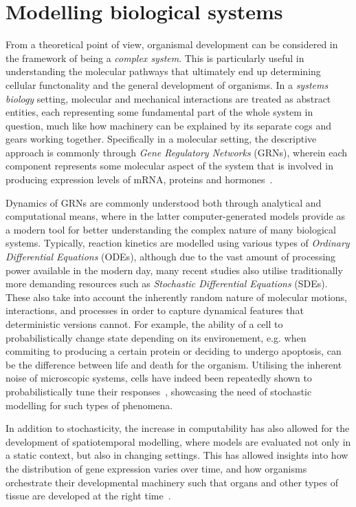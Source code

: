 \section{Modelling biological systems} %
\label{sec:modelling}
From a theoretical point of view, organismal development can be
considered in the framework of being a \textit{complex system}. This is
particularly useful in understanding the molecular pathways that ultimately end
up determining cellular functonality and the general development of organisms.
In a \textit{systems biology} setting, molecular and mechanical interactions are
treated as abstract entities, each representing some fundamental part of the
whole system in question, much like how machinery can be explained by its
separate cogs and gears working together. Specifically in a molecular setting,
the descriptive approach is commonly through \textit{Gene Regulatory Networks}
(GRNs), wherein each component represents some molecular aspect of the system
that is involved in producing expression levels of mRNA, proteins and
hormones~\cite{kitano2002systems}.

Dynamics of GRNs are commonly understood both through analytical and computational means,
where in the latter computer-generated models provide as a modern tool for
better understanding the complex nature of many biological systems. Typically,
reaction kinetics are modelled using various types of \textit{Ordinary
  Differential Equations} (ODEs), although due to the vast amount of processing
power available in the modern day, many recent studies also utilise
traditionally more demanding resources such as \textit{Stochastic Differential
  Equations} (SDEs). These also take into account the inherently random nature of molecular
motions, interactions, and processes in order to capture dynamical features that
deterministic versions cannot. For example, the ability of a cell to
probabilistically change state depending on its environement, e.g.
when commiting to producing a certain protein or deciding to undergo apoptosis,
can be the difference between life and death for the organism. Utilising the
inherent noise of microscopic 
systems, cells have indeed been repeatedly shown to probabilistically tune their
responses~\cite{locke2011stochastic,losick2008stochasticity,mennstochastic}, showcasing the need of stochastic modelling for such types of
phenomena.

In addition to stochasticity, the increase in computability has also allowed for
the development of spatiotemporal modelling, where models are evaluated not only
in a static context, but also in changing settings. This has allowed insights
into how the distribution of gene expression varies over time, and how organisms
orchestrate their developmental machinery such that organs and other types of
tissue are developed at the right time~\cite{ietswaart2015spatiotemporal}. 

